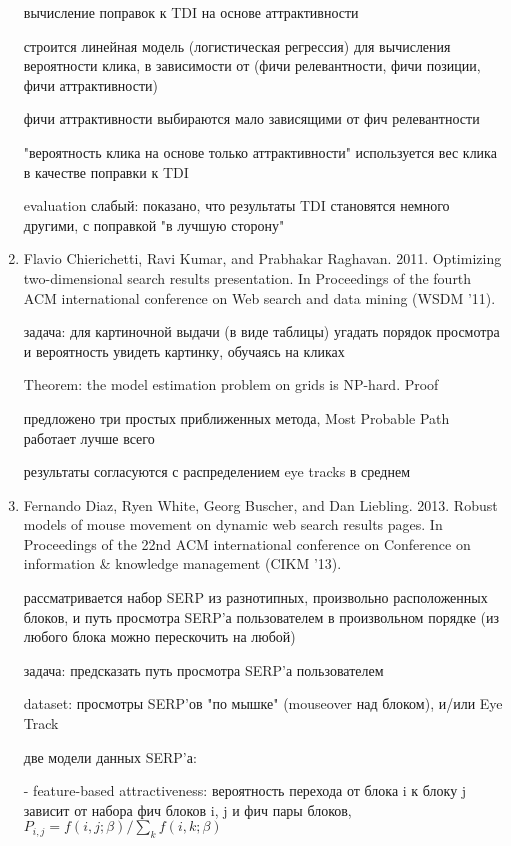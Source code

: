 \documentclass[12pt,a4paper]{article}
\begin{document}
\begin{enumerate}
  вычисление поправок к TDI на основе аттрактивности

  строится линейная модель (логистическая регрессия) для вычисления вероятности клика, в зависимости от
  (фичи релевантности, фичи позиции, фичи аттрактивности)

  фичи аттрактивности выбираются мало зависящими от фич релевантности

  "вероятность клика на основе только аттрактивности" используется вес клика в качестве поправки к TDI

  evaluation слабый: показано, что результаты TDI становятся немного другими, с поправкой "в лучшую сторону"

\item Flavio Chierichetti, Ravi Kumar, and Prabhakar Raghavan. 2011. Optimizing two-dimensional search results presentation. In Proceedings of the fourth ACM international conference on Web search and data mining (WSDM '11).

  задача: для картиночной выдачи (в виде таблицы) угадать порядок просмотра и вероятность увидеть картинку, обучаясь на кликах

  Theorem: the model estimation problem on grids is NP-hard. Proof

  предложено три простых приближенных метода, Most Probable Path работает лучше всего

  результаты согласуются с распределением eye tracks в среднем

\item Fernando Diaz, Ryen White, Georg Buscher, and Dan Liebling. 2013. Robust models of mouse movement on dynamic web search results pages. In Proceedings of the 22nd ACM international conference on Conference on information \& knowledge management (CIKM '13).

  рассматривается набор SERP из разнотипных, произвольно расположенных блоков,
  и путь просмотра SERP'а пользователем в произвольном порядке (из любого блока можно перескочить на любой)

  задача: предсказать путь просмотра SERP'а пользователем

  dataset: просмотры SERP'ов "по мышке" (mouseover над блоком), и/или Eye Track

  две модели данных SERP'а:

        - feature-based attractiveness: вероятность перехода от блока i к блоку j зависит от набора фич блоков i, j и фич пары блоков,
	  $P_{i,j} = f(i,j; \beta) / \sum_k f(i,k; \beta)$


\end{enumerate}
\end{document}

